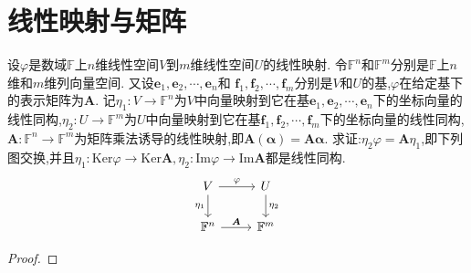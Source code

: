 \documentclass[../../main.tex]{subfiles}
\begin{document}
\section{线性映射与矩阵}

\begin{theorem}\label{theorem:线性映射与矩阵基本定理}
设\(\varphi\)是数域\(\mathbb{F}\)上\(n\)维线性空间\(V\)到\(m\)维线性空间\(U\)的线性映射. 令\(\mathbb{F}^n\)和\(\mathbb{F}^m\)分别是\(\mathbb{F}\)上\(n\)维和\(m\)维列向量空间. 又设\(\boldsymbol{e}_1,\boldsymbol{e}_2,\cdots,\boldsymbol{e}_n\)和
\(\boldsymbol{f}_1,\boldsymbol{f}_2,\cdots,\boldsymbol{f}_m\)分别是\(V\)和\(U\)的基,\(\varphi\)在给定基下的表示矩阵为\(\boldsymbol{A}\). 记\(\eta_1:V\to\mathbb{F}^n\)为\(V\)中向量映射到它在基\(\boldsymbol{e}_1,\boldsymbol{e}_2,\cdots,\boldsymbol{e}_n\)下的坐标向量的线性同构,\(\eta_2:U\to\mathbb{F}^m\)为\(U\)中向量映射到它在基\(\boldsymbol{f}_1,\boldsymbol{f}_2,\cdots,\boldsymbol{f}_m\)下的坐标向量的线性同构,\(\boldsymbol{A}:\mathbb{F}^n\to\mathbb{F}^m\)为矩阵乘法诱导的线性映射,即\(\boldsymbol{A}(\boldsymbol{\alpha})=\boldsymbol{A}\boldsymbol{\alpha}\). 求证:\(\eta_2\varphi=\boldsymbol{A}\eta_1\),即下列图交换,并且\(\eta_1:\text{Ker}\varphi\to\text{Ker}\boldsymbol{A},\eta_2:\text{Im}\varphi\to\text{Im}\boldsymbol{A}\)都是线性同构.
\[\begin{tikzcd}
V \arrow[r, "\varphi"] \arrow[d, "\eta_1"'] & U \arrow[d, "\eta_2"] \\
\mathbb{F}^n \arrow[r, "\boldsymbol{A}"]    & \mathbb{F}^m         
\end{tikzcd}
\]
\end{theorem}
\begin{proof}

\end{proof}
\end{document}
